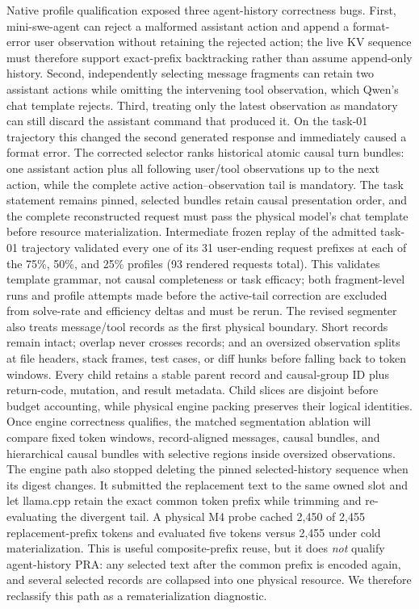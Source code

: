 \documentclass[11pt]{article}
\begin{document}
Native profile qualification exposed three agent-history correctness bugs.
First, mini-swe-agent can reject a malformed assistant action and append a
format-error user observation without retaining the rejected action; the live
KV sequence must therefore support exact-prefix backtracking rather than assume
append-only history. Second, independently selecting message fragments can
retain two assistant actions while omitting the intervening tool observation,
which Qwen's chat template rejects. Third, treating only the latest observation
as mandatory can still discard the assistant command that produced it. On the
task-01 trajectory this changed the second generated response and immediately
caused a format error. The corrected selector ranks historical atomic causal
turn bundles: one assistant action plus all following user/tool observations up
to the next action, while the complete active action--observation tail is
mandatory. The task statement remains pinned, selected bundles retain causal
presentation order, and the complete reconstructed request must pass the
physical model's chat template before resource materialization. Intermediate
frozen replay
of the admitted task-01 trajectory validated every one of its 31 user-ending
request prefixes at each of the 75\%, 50\%, and 25\% profiles (93 rendered
requests total). This validates template grammar, not causal completeness or
task efficacy; both fragment-level runs and profile attempts made before the
active-tail correction are excluded from solve-rate and efficiency deltas and
must be rerun.
The revised segmenter also treats message/tool records as the first physical
boundary. Short records remain intact; overlap never crosses records; and an
oversized observation splits at file headers, stack frames, test cases, or diff
hunks before falling back to token windows. Every child retains a stable parent
record and causal-group ID plus return-code, mutation, and result metadata.
Child slices are disjoint before budget accounting, while physical engine
packing preserves their logical identities. Once engine correctness qualifies,
the matched segmentation ablation will compare fixed token windows,
record-aligned messages, causal bundles, and hierarchical causal bundles with
selective regions inside oversized observations.
The engine path also stopped deleting the pinned selected-history sequence when
its digest changes. It submitted the replacement text to the same owned slot
and let llama.cpp retain the exact common token prefix while trimming and
re-evaluating the divergent tail. A physical M4 probe cached 2,450 of 2,455
replacement-prefix tokens and evaluated five tokens versus 2,455 under cold
materialization. This is useful composite-prefix reuse, but it does
\emph{not} qualify agent-history PRA: any selected text after the common prefix
is encoded again, and several selected records are collapsed into one physical
resource. We therefore reclassify this path as a rematerialization diagnostic.
\end{document}
